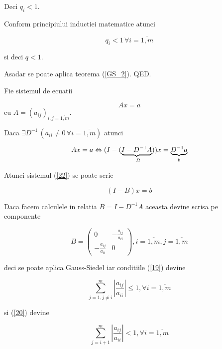 \documentclass[a4paper,twoside]{book}
\begin{document}
Deci $q_{i}<1$.

Conform principiului inductiei matematice atunci

\begin{equation*}
q_{i}<1\,\forall i=\overline{1,m}
\end{equation*}

si deci $q<1$.

Asadar se poate aplica teorema (\ref{GS_2}). QED.

Fie sistemul de ecuatii

\begin{equation}
Ax=a  \label{22}
\end{equation}
cu $A=(a_{ij})_{i,j=\overline{1,m}}$.

Daca $\exists D^{-1}\,(a_{ii}\neq 0\,\forall i=\overline{1,m})$ atunci

\begin{equation*}
Ax=a\Leftrightarrow (I-(\underset{B}{\underbrace{I-D^{-1}A})})x=\underset{b}{%
\underbrace{D^{-1}a}}
\end{equation*}

Atunci sistemul (\ref{22}) se poate scrie

\begin{equation*}
(I-B)x=b
\end{equation*}

Daca facem calculele in relatia $B=I-D^{-1}A$ aceasta devine scrisa pe
componente

\begin{equation*}
B=\left( 
\begin{array}{cc}
0 & -\frac{a_{ij}}{a_{ii}} \\ 
-\frac{a_{ij}}{a_{ii}} & 0%
\end{array}%
\right) ,i=\overline{1,m},j=\overline{1,m}
\end{equation*}

deci se poate aplica Gauss-Siedel iar conditiile (\ref{19}) devine

\begin{equation}
\sum_{j=1,j\neq i}^{m}\left\vert \frac{a_{ij}}{a_{ii}}\right\vert \leq
1,\forall i=\overline{1,m}  \label{23}
\end{equation}

si (\ref{20}) devine

\begin{equation}
\sum_{j=i+1}^{m}\left\vert \frac{a_{ij}}{a_{ii}}\right\vert <1,\forall i=%
\overline{1,m}  \label{24}
\end{equation}
\end{document}
